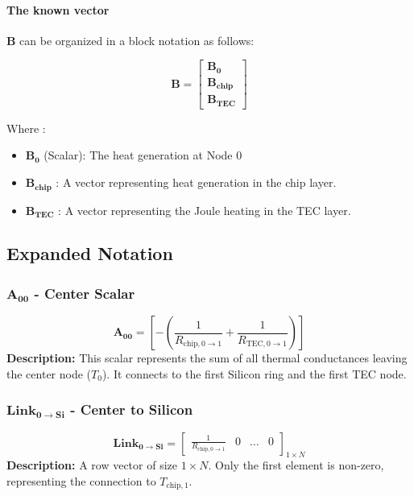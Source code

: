 \documentclass[10pt,a4paper,twocolumn]{article}
\begin{document}
\paragraph{The known vector} $\mathbf{B}$ can be organized in a block notation as follows:

\begin{equation}
	\mathbf{B}= 
	\begin{bmatrix} 
		\mathbf{B_0} \\  \mathbf{B_{\text{chip}}} \\ \mathbf{B_{\text{TEC}}}
	\end{bmatrix}
\end{equation}

Where :

\begin{itemize}
	\item $\mathbf{B_0}$ (Scalar): The heat generation at Node 0
	\item $\mathbf{B_{\text{chip}}}$ : A vector representing heat generation in the chip layer.
	\item $\mathbf{B_{\text{TEC}}}$ : A vector representing the Joule heating in the TEC layer.
\end{itemize}

\subsection{Expanded Notation}

\subsubsection{$\mathbf{A_{00}}$ - Center Scalar}
$$ \mathbf{A_{00}} = \left[ -\left(\frac{1}{R_{\text{chip}, 0\to 1}} + \frac{1}{R_{\text{TEC}, 0\to 1}}\right) \right] $$
\textbf{Description:} This scalar represents the sum of all thermal conductances leaving the center node ($T_0$). It connects to the first Silicon ring and the first TEC node.

\subsubsection{$\mathbf{Link_{0 \to Si}}$ - Center to Silicon}
$$ \mathbf{Link_{0 \to Si}} = \begin{bmatrix} \frac{1}{R_{\text{chip}, 0\to 1}} & 0 & \dots & 0 \end{bmatrix}_{1 \times N} $$
\textbf{Description:} A row vector of size $1 \times N$. Only the first element is non-zero, representing the connection to $T_{\text{chip},1}$.
\end{document}
